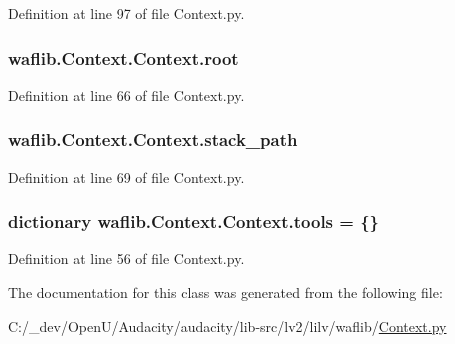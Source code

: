 Definition at line 97 of file Context.\+py.

\subsubsection[{\texorpdfstring{root}{root}}]{\setlength{\rightskip}{0pt plus 5cm}waflib.\+Context.\+Context.\+root}\hypertarget{classwaflib_1_1_context_1_1_context_a89adc3ac5396d5dff66b3b7df191804b}{}\label{classwaflib_1_1_context_1_1_context_a89adc3ac5396d5dff66b3b7df191804b}


Definition at line 66 of file Context.\+py.

\subsubsection[{\texorpdfstring{stack\+\_\+path}{stack_path}}]{\setlength{\rightskip}{0pt plus 5cm}waflib.\+Context.\+Context.\+stack\+\_\+path}\hypertarget{classwaflib_1_1_context_1_1_context_a3dd26f36f10087e5976da9bedf96a1f1}{}\label{classwaflib_1_1_context_1_1_context_a3dd26f36f10087e5976da9bedf96a1f1}


Definition at line 69 of file Context.\+py.

\subsubsection[{\texorpdfstring{tools}{tools}}]{\setlength{\rightskip}{0pt plus 5cm}dictionary waflib.\+Context.\+Context.\+tools = \{\}\hspace{0.3cm}{\ttfamily [static]}}\hypertarget{classwaflib_1_1_context_1_1_context_ae43339d845c58ba7b631c928c8092c61}{}\label{classwaflib_1_1_context_1_1_context_ae43339d845c58ba7b631c928c8092c61}


Definition at line 56 of file Context.\+py.



The documentation for this class was generated from the following file\+:\begin{DoxyCompactItemize}
\item 
C\+:/\+\_\+dev/\+Open\+U/\+Audacity/audacity/lib-\/src/lv2/lilv/waflib/\hyperlink{lilv_2waflib_2_context_8py}{Context.\+py}\end{DoxyCompactItemize}
